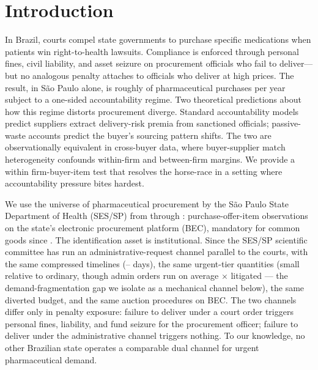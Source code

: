 \section{Introduction}
\label{sec:introduction}

In Brazil, courts compel state governments to purchase specific
medications when patients win right-to-health lawsuits. Compliance
is enforced through personal fines, civil liability, and asset
seizure on procurement officials who fail to deliver---but no
analogous penalty attaches to officials who deliver at high prices.
The result, in S\~ao Paulo alone, is roughly
\BPwelfareBoundAnnualSpend{} of pharmaceutical purchases per year
subject to a one-sided accountability regime. Two theoretical
predictions about how this regime distorts procurement diverge.
Standard accountability models \citep{prendergast2007bureaucrats}
predict suppliers extract delivery-risk premia from sanctioned
officials; passive-waste accounts \citep{bandiera2009active}
predict the buyer's sourcing pattern shifts. The two are
observationally equivalent in cross-buyer data, where
buyer-supplier match heterogeneity confounds within-firm and
between-firm margins. We provide a within firm-buyer-item test
that resolves the horse-race in a setting where accountability
pressure bites hardest.

We use the universe of pharmaceutical procurement by the S\~ao Paulo
State Department of Health (SES/SP) from \BPsampleStartYear{} through
\BPsampleEndYear: \BPnPOIfull{} purchase-offer-item observations on
the state's electronic procurement platform (BEC), mandatory for
common goods since \BPbecMandatorySinceYear. The identification asset
is institutional. Since \BPsampleStartYear{} the SES/SP scientific
committee has run an administrative-request channel parallel to the
courts, with the same compressed timelines
(\BPurgentPlanLow--\BPurgentPlanHigh{} days), the same urgent-tier
quantities (small relative to ordinary, though admin orders run on
average \BPutgQtyAdminFoldPref$\times$ litigated --- the
demand-fragmentation gap we isolate as a mechanical channel
below), the same diverted budget, and the same auction procedures
on BEC. The two channels differ only in penalty exposure: failure to
deliver under a court order triggers personal fines, liability, and
fund seizure for the procurement officer; failure to deliver under
the administrative channel triggers nothing. To our knowledge, no
other Brazilian state operates a comparable dual channel for urgent
pharmaceutical demand.

